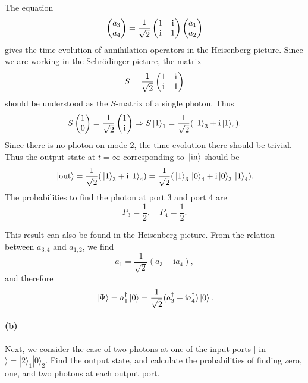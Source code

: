 \documentclass[hyperref, a4paper]{article}
\newcommand*{\ii}{\mathrm{i}}
\begin{document}
The equation 
\begin{equation}
    \pmqty{a_3 \\ a_4} = \frac{1}{\sqrt{2}} \pmqty{1 & \ii \\ \ii & 1} \pmqty{a_1 \\ a_2} 
\end{equation}
gives the time evolution of annihilation operators in the Heisenberg picture.
Since we are working in the Schrödinger picture, the matrix 
\begin{equation}
    S = \frac{1}{\sqrt{2}} \pmqty{1 & \ii \\ \ii & 1}
\end{equation}
should be understood as the $S$-matrix of a single photon.
Thus 
\[
    S \pmqty{1 \\ 0} = \frac{1}{\sqrt{2}} \pmqty{1 \\ \ii} \Rightarrow 
    S \ket*{1}_1 = \frac{1}{\sqrt{2}} (\ket*{1}_3 + \ii \ket*{1}_4) .
\]
Since there is no photon on mode 2, the time evolution there should be trivial.
Thus the output state at $t = \infty$ corresponding to $\ket*{\text{in}}$ should be 
\begin{equation}
    \ket*{\text{out}} = \frac{1}{\sqrt{2}} (\ket*{1}_3 + \ii \ket*{1}_4)
    = \frac{1}{\sqrt{2}} (\ket*{1}_3 \ket*{0}_4 + \ii \ket*{0}_3 \ket*{1}_4).
\end{equation}
The probabilities to find the photon at port 3 and port 4 are 
\begin{equation}
    P_3 = \frac{1}{2}, \quad P_4 = \frac{1}{2}.
\end{equation} 

This result can also be found in the Heisenberg picture.
From the relation between $a_{3,4}$ and $a_{1,2}$, we find 
\[
    a_1 = \frac{1}{\sqrt{2}} (a_3 - \ii a_4),
\]
and therefore 
\begin{equation}
    \ket*{\Psi} = a_1^\dag \ket*{0} = \frac{1}{\sqrt{2}} (a^\dag_3 + \ii a^\dag_4) \ket*{0}.
\end{equation}

\paragraph*{(b)} Next, we consider the case of two photons at one of the input ports $\mid$ in $\rangle=|2\rangle_1|0\rangle_2$. Find the output state, and calculate the probabilities of finding zero, one, and two photons at each output port.
\end{document}
